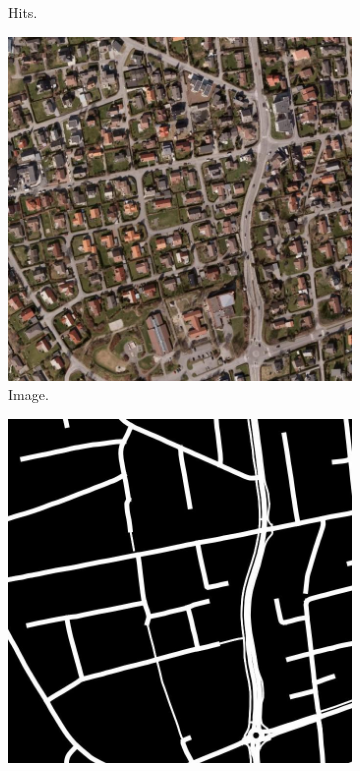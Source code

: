 \begin{figure}[H]
\begin{subfigure}{0.23\textwidth}
\caption{ Hits. }
\vspace{0.1cm} %
\end{subfigure}
\begin{subfigure}{0.23\textwidth}
\includegraphics[width=\textwidth]{figs/appendix/img1160.jpg}
\caption{ Image.}
\vspace{0.1cm} %
\end{subfigure}
\hspace*{\fill} %
\begin{subfigure}{0.23\textwidth}
\includegraphics[width=\textwidth]{figs/appendix/label1160.jpg}

\end{subfigure}
\end{figure}
